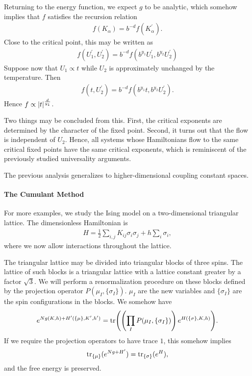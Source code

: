 Returning to the energy function, we expect $g$ to be analytic, which somehow implies that $f$ satisfies the recursion relation
\begin{align*}
	f\left(K_{\alpha}\right) = b^{-d}f\left(K_{\alpha}^{\prime}\right).
\end{align*}
Close to the critical point, this may be written as
\begin{align*}
	f(U_{1}^{\prime}, U_{2}^{\prime}) = b^{-d}f\left(b^{y_{1}}U_{1}^{\prime}, b^{y_{2}}U_{2}^{\prime}\right)
\end{align*}
Suppose now that $U_{1}\propto t$ while $U_{2}$ is approximately unchanged by the temperature. Then
\begin{align*}
	f(t, U_{2}^{\prime}) = b^{-d}f\left(b^{y_{1}}t, b^{y_{2}}U_{2}^{\prime}\right).
\end{align*}
Hence $f\propto\abs{t}^{\frac{d}{y_{1}}}$.

Two things may be concluded from this. First, the critical exponents are determined by the character of the fixed point. Second, it turns out that the flow is independent of $U_{2}$. Hence, all systems whose Hamiltonians flow to the same critical fixed points have the same critical exponents, which is reminiscent of the previously studied universality arguments.

The previous analysis generalizes to higher-dimensional coupling constant spaces.

\paragraph{The Cumulant Method}
For more examples, we study the Ising model on a two-dimensional triangular lattice. The dimensionless Hamiltonian is
\begin{align*}
	H = \frac{1}{2}\sum\limits_{i, j}K_{ij}\sigma_{i}\sigma_{j} + h\sum\limits_{i}\sigma_{i},
\end{align*}
where we now allow interactions throughout the lattice.

The triangular lattice may be divided into triangular blocks of three spins. The lattice of such blocks is a triangular lattice with a lattice constant greater by a factor $\sqrt{3}$. We will perform a renormalization procedure on these blocks defined by the projection operator $P(\mu_{I}, \{\sigma_{I}\})$. $\mu_{I}$ are the new variables and $\{\sigma_{I}\}$ are the spin configurations in the blocks. We somehow have
\begin{align*}
	e^{Ng(K, h) + H^{\prime}(\{\mu\}, K^{\prime}, h^{\prime})} = \tr(\left(\prod\limits_{I}P(\mu_{I}, \{\sigma_{I}\})\right)e^{H(\{\sigma\}, K , h)}).
\end{align*}
If we require the projection operators to have trace $1$, this somehow implies
\begin{align*}
	\tr\limits_{\{\mu\}}(e^{Ng + H^{\prime}}) = \tr\limits_{\{\sigma\}}(e^{H}),
\end{align*}
and the free energy is preserved.

